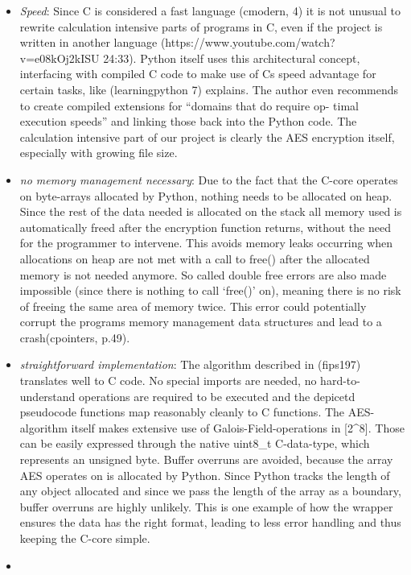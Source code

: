 \begin{itemize}
\tightlist
\item
  \emph{Speed}: Since C is considered a fast language (cmodern, 4) it is
  not unusual to rewrite calculation intensive parts of programs in C,
  even if the project is written in another language
  (https://www.youtube.com/watch?v=e08kOj2kISU 24:33). Python itself
  uses this architectural concept, interfacing with compiled C code to
  make use of Cs speed advantage for certain tasks, like (learningpython
  7) explains. The author even recommends to create compiled extensions
  for ``domains that do require op- timal execution speeds'' and linking
  those back into the Python code. The calculation intensive part of our
  project is clearly the AES encryption itself, especially with growing
  file size.
\item
  \emph{no memory management necessary}: Due to the fact that the C-core
  operates on byte-arrays allocated by Python, nothing needs to be
  allocated on heap. Since the rest of the data needed is allocated on
  the stack all memory used is automatically freed after the encryption
  function returns, without the need for the programmer to intervene.
  This avoids memory leaks occurring when allocations on heap are not
  met with a call to free() after the allocated memory is not needed
  anymore. So called double free errors are also made impossible (since
  there is nothing to call `free()' on), meaning there is no risk of
  freeing the same area of memory twice. This error could potentially
  corrupt the programs memory management data structures and lead to a
  crash(cpointers, p.49).
\item
  \emph{straightforward implementation}: The algorithm described in
  (fips197) translates well to C code. No special imports are needed, no
  hard-to-understand operations are required to be executed and the
  depicetd pseudocode functions map reasonably cleanly to C functions.
  The AES-algorithm itself makes extensive use of
  Galois-Field-operations in {[}2\^{}8{]}. Those can be easily expressed
  through the native uint8\_t C-data-type, which represents an unsigned
  byte. Buffer overruns are avoided, because the array AES operates on
  is allocated by Python. Since Python tracks the length of any object
  allocated and since we pass the length of the array as a boundary,
  buffer overruns are highly unlikely. This is one example of how the
  wrapper ensures the data has the right format, leading to less error
  handling and thus keeping the C-core simple.
\item

\end{itemize}
